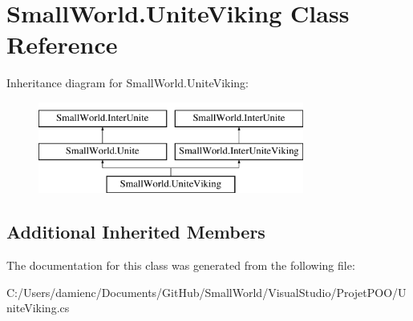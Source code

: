 \hypertarget{class_small_world_1_1_unite_viking}{\section{Small\-World.\-Unite\-Viking Class Reference}
\label{class_small_world_1_1_unite_viking}
}
Inheritance diagram for Small\-World.\-Unite\-Viking\-:\begin{figure}[H]
\begin{center}
\leavevmode
\includegraphics[height=3.000000cm]{class_small_world_1_1_unite_viking}
\end{center}
\end{figure}
\subsection*{Additional Inherited Members}


The documentation for this class was generated from the following file\-:\begin{DoxyCompactItemize}
\item 
C\-:/\-Users/damienc/\-Documents/\-Git\-Hub/\-Small\-World/\-Visual\-Studio/\-Projet\-P\-O\-O/Unite\-Viking.\-cs\end{DoxyCompactItemize}
